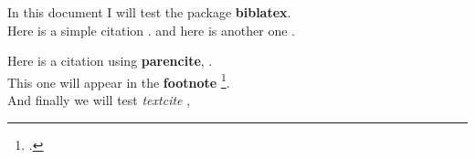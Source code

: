 \documentclass[12pt]{article}
\begin{document}
  In this document I will test the package \textbf{biblatex}.\\
  Here is a simple citation \cite{golub1996matrix}. and here is another one \cite[see][page 12]{GEMAN84}.

  Here is a citation using \textbf{parencite}, \parencite{HoPa95}.\\

  This one will appear in the \textbf{footnote} \footcite{Feng2015}.\\

  And finally we will test \emph{textcite} ,\textcite{HoPa95}




  \printbibliography
\end{document}
